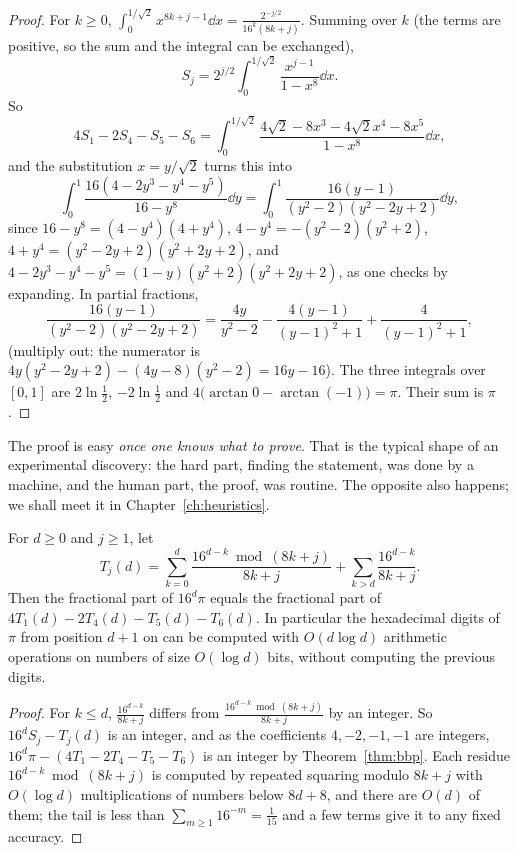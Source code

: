 \begin{proof}
For $k\ge0$, $\int_0^{1/\sqrt2}x^{8k+j-1}\dd x=\frac{2^{-j/2}}{16^k(8k+j)}$. Summing over $k$ (the terms are positive, so the sum and the integral can be exchanged),
\[
S_j=2^{j/2}\int_0^{1/\sqrt2}\frac{x^{j-1}}{1-x^8}\dd x.
\]
So
\[
4S_1-2S_4-S_5-S_6=\int_0^{1/\sqrt2}\frac{4\sqrt2-8x^3-4\sqrt2x^4-8x^5}{1-x^8}\dd x,
\]
and the substitution $x=y/\sqrt2$ turns this into
\[
\int_0^1\frac{16(4-2y^3-y^4-y^5)}{16-y^8}\dd y=\int_0^1\frac{16(y-1)}{(y^2-2)(y^2-2y+2)}\dd y,
\]
since $16-y^8=(4-y^4)(4+y^4)$, $4-y^4=-(y^2-2)(y^2+2)$, $4+y^4=(y^2-2y+2)(y^2+2y+2)$, and $4-2y^3-y^4-y^5=(1-y)(y^2+2)(y^2+2y+2)$, as one checks by expanding. In partial fractions,
\[
\frac{16(y-1)}{(y^2-2)(y^2-2y+2)}=\frac{4y}{y^2-2}-\frac{4(y-1)}{(y-1)^2+1}+\frac4{(y-1)^2+1},
\]
(multiply out: the numerator is $4y(y^2-2y+2)-(4y-8)(y^2-2)=16y-16$). The three integrals over $[0,1]$ are $2\ln\frac12$, $-2\ln\frac12$ and $4\bigl(\arctan0-\arctan(-1)\bigr)=\pi$. Their sum is $\pi$.
\end{proof}

The proof is easy \emph{once one knows what to prove}. That is the typical shape of an experimental discovery: the hard part, finding the
statement, was done by a machine, and the human part, the proof, was routine. The opposite also happens; we shall meet it in Chapter~\ref{ch:heuristics}.

\begin{proposition}\label{prop:digits}
For $d\ge0$ and $j\ge1$, let
\[
T_j(d)=\sum_{k=0}^d\frac{16^{d-k}\bmod(8k+j)}{8k+j}+\sum_{k>d}\frac{16^{d-k}}{8k+j}.
\]
Then the fractional part of $16^d\pi$ equals the fractional part of $4T_1(d)-2T_4(d)-T_5(d)-T_6(d)$. In particular the hexadecimal digits of $\pi$ from position $d+1$ on can be
computed with $O(d\log d)$ arithmetic operations on numbers of size $O(\log d)$ bits, without computing the previous digits.
\end{proposition}

\begin{proof}
For $k\le d$, $\frac{16^{d-k}}{8k+j}$ differs from $\frac{16^{d-k}\bmod(8k+j)}{8k+j}$ by an integer. So $16^dS_j-T_j(d)$ is an integer, and as the coefficients $4,-2,-1,-1$ are integers,
$16^d\pi-(4T_1-2T_4-T_5-T_6)$ is an integer by Theorem~\ref{thm:bbp}. Each residue $16^{d-k}\bmod(8k+j)$ is computed by repeated squaring modulo $8k+j$ with $O(\log d)$ multiplications of
numbers below $8d+8$, and there are $O(d)$ of them; the tail is less than $\sum_{m\ge1}16^{-m}=\frac1{15}$ and a few terms give it to any fixed accuracy.
\end{proof}

